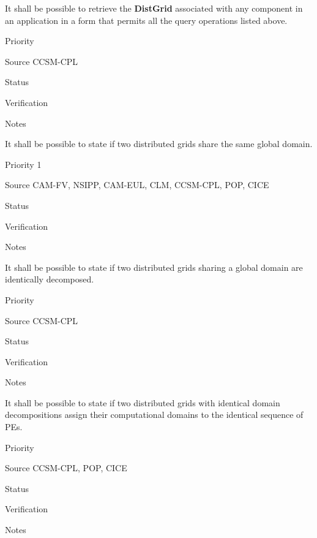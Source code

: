 
It shall be possible to retrieve the \textbf{DistGrid} associated with
any component in an application in a form that permits all the query
operations listed above.

\begin{reqlist}
\item[Priority]
\item[Source] CCSM-CPL
\item[Status]
\item[Verification]
\item[Notes]
\end{reqlist}



It shall be possible to state if two distributed grids share the same
global domain.

\begin{reqlist}
\item[Priority] 1
\item[Source] CAM-FV, NSIPP, CAM-EUL, CLM, CCSM-CPL, POP, CICE
\item[Status]
\item[Verification]
\item[Notes]
\end{reqlist}



It shall be possible to state if two distributed grids sharing a
global domain are identically decomposed.

\begin{reqlist}
\item[Priority]
\item[Source] CCSM-CPL
\item[Status]
\item[Verification]
\item[Notes]
\end{reqlist}


It shall be possible to state if two distributed grids with identical
domain decompositions assign their computational domains to the
identical sequence of PEs.

\begin{reqlist}
\item[Priority]
\item[Source] CCSM-CPL, POP, CICE
\item[Status]
\item[Verification]
\item[Notes]
\end{reqlist}

